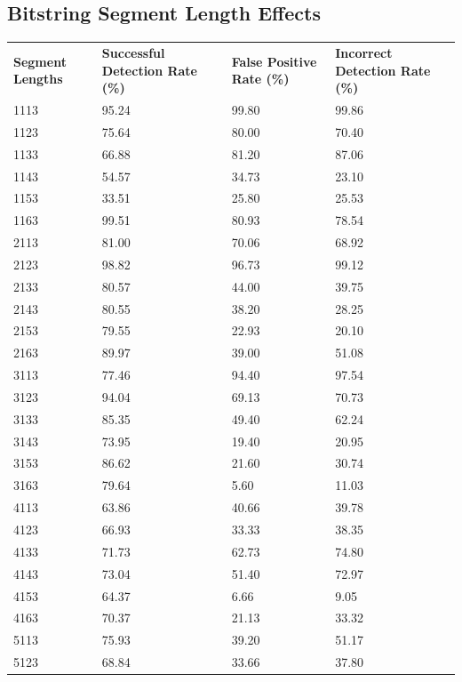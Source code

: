 \begin{appendices}
\newpage
\subsection{Bitstring Segment Length Effects}

\begin{longtable}{|p{1.5in}|p{1in}|p{1in}|p{1in}|}
	\hline
	\textbf{Segment Lengths} & \textbf{Successful Detection Rate (\%)} & \textbf{False Positive Rate (\%)} & \textbf{Incorrect Detection Rate (\%)}  \\
	\hhline{|=|=|=|=|}
	1113 & 95.24 & 99.80 & 99.86 \\ \hline
	1123 & 75.64 & 80.00 & 70.40 \\ \hline
	1133 & 66.88 & 81.20 & 87.06 \\ \hline
	1143 & 54.57 & 34.73 & 23.10 \\ \hline
	1153 & 33.51 & 25.80 & 25.53 \\ \hline
	1163 & 99.51 & 80.93 & 78.54 \\ \hline
	2113 & 81.00 & 70.06 & 68.92 \\ \hline
	2123 & 98.82 & 96.73 & 99.12 \\ \hline
	2133 & 80.57 & 44.00 & 39.75 \\ \hline
	2143 & 80.55 & 38.20 & 28.25 \\ \hline
	2153 & 79.55 & 22.93 & 20.10 \\ \hline
	2163 & 89.97 & 39.00 & 51.08 \\ \hline
	3113 & 77.46 & 94.40 & 97.54 \\ \hline
	3123 & 94.04 & 69.13 & 70.73 \\ \hline
	3133 & 85.35 & 49.40 & 62.24 \\ \hline
	3143 & 73.95 & 19.40 & 20.95 \\ \hline
	3153 & 86.62 & 21.60 & 30.74 \\ \hline
	3163 & 79.64 &  5.60 & 11.03 \\ \hline
	4113 & 63.86 & 40.66 & 39.78 \\ \hline
	4123 & 66.93 & 33.33 & 38.35 \\ \hline
	4133 & 71.73 & 62.73 & 74.80 \\ \hline
	4143 & 73.04 & 51.40 & 72.97 \\ \hline
	4153 & 64.37 &  6.66 &  9.05 \\ \hline
	4163 & 70.37 & 21.13 & 33.32 \\ \hline
	5113 & 75.93 & 39.20 & 51.17 \\ \hline 
	5123 & 68.84 & 33.66 & 37.80 \\ \hline

\end{longtable}
\end{appendices}
